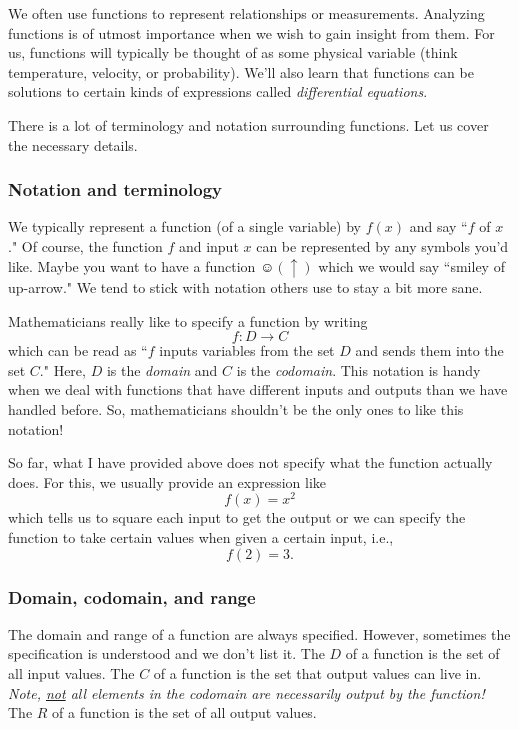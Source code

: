     We often use functions to represent relationships or measurements.  Analyzing functions is of utmost importance when we wish to gain insight from them.  For us, functions will typically be thought of as some physical variable (think temperature, velocity, or probability). We'll also learn that functions can be solutions to certain kinds of expressions called \emph{differential equations}.  
    
    There is a lot of terminology and notation surrounding functions. Let us cover the necessary details. 
    
    \subsubsection{Notation and terminology}
    
    We typically represent a function (of a single variable) by $f(x)$ and say ``$f$ of $x$." Of course, the function $f$ and input $x$ can be represented by any symbols you'd like.  Maybe you want to have a function $\smiley(\uparrow)$ which we would say ``smiley of up-arrow." We tend to stick with notation others use to stay a bit more sane.
    
    Mathematicians really like to specify a function by writing
    \[
    f\colon D \to C
    \]
    which can be read as ``$f$ inputs variables from the set $D$ and sends them into the set $C$." Here, $D$ is the \emph{domain} and $C$ is the \emph{codomain}. This notation is handy when we deal with functions that have different inputs and outputs than we have handled before. So, mathematicians shouldn't be the only ones to like this notation!
    
    So far, what I have provided above does not specify what the function actually does.  For this, we usually provide an expression like
    \[
    f(x)=x^2
    \]
    which tells us to square each input to get the output or we can specify the function to take certain values when given a certain input, i.e.,
    \[
    f(2)=3.
    \]
    
    
    \subsubsection{Domain, codomain, and range}
    
    The domain and range of a function are always specified. However, sometimes the specification is understood and we don't list it.  The  $D$ of a function is the set of all input values.  The  $C$ of a function is the set that output values can live in.  \emph{Note, \underline{not} all elements in the codomain are necessarily output by the function!} The  $R$ of a function is the set of all output values.  
    
